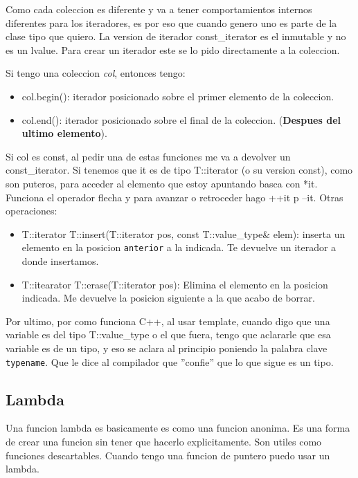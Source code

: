 \documentclass[11pt]{article}
\begin{document}
Como cada coleccion  es diferente y va a tener comportamientos internos diferentes para
los iteradores, es por eso que cuando genero uno es parte de la clase tipo que quiero.
La version de iterador const\_iterator es el inmutable y no es un lvalue.
Para crear un iterador este se lo pido directamente a la coleccion.

Si tengo una coleccion \textit{col}, entonces tengo:
\begin{itemize}
    \item col.begin(): iterador posicionado sobre el primer elemento
        de la coleccion.
    \item col.end(): iterador posicionado sobre el final de la coleccion.
        (\textbf{Despues del ultimo elemento}).
\end{itemize}

Si col es const, al pedir una de estas funciones me va a devolver un const\_iterator.
Si tenemos que it es de tipo T::iterator (o su version const),
como son puteros, para acceder al elemento que estoy apuntando basca con *it.
Funciona el operador flecha y para avanzar o retroceder hago ++it p --it.
Otras operaciones:

\begin{itemize}
    \item T::iterator T::insert(T::iterator pos, const T::value\_type\& elem):
        inserta un elemento en la posicion \texttt{anterior} a la indicada.
        Te devuelve un iterador a donde insertamos.
    \item T::itearator T::erase(T::iterator pos): Elimina el elemento en la posicion
        indicada. Me devuelve la posicion siguiente a la que acabo de borrar.
\end{itemize}

Por ultimo, por como funciona C++, al usar template, cuando digo que una variable
es del tipo T::value\_type o el que fuera, tengo que aclararle que esa variable es
de un tipo, y eso se aclara al principio poniendo la palabra clave \texttt{typename}.
Que le dice al compilador que ''confie'' que lo que sigue es un tipo.

\subsection{Lambda}
Una funcion lambda es basicamente es como una funcion anonima.
Es una forma de crear una funcion sin tener que hacerlo explicitamente.
Son utiles como funciones descartables.
Cuando tengo una funcion de puntero puedo usar un lambda.
\end{document}
